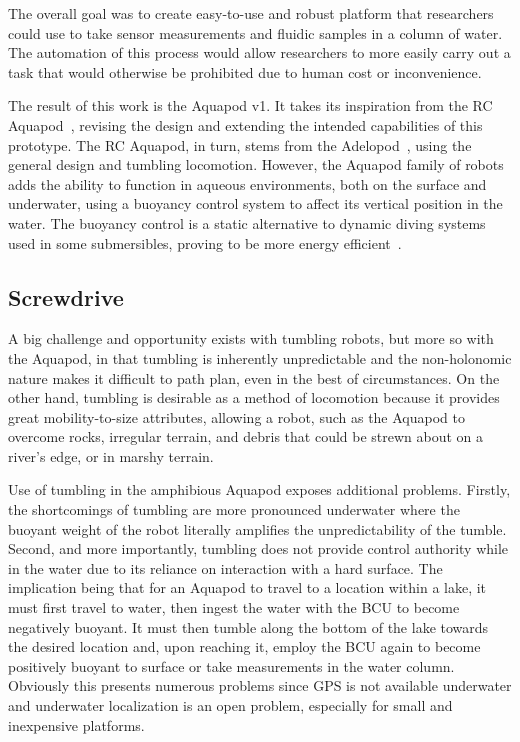 The overall goal was to create easy-to-use and robust platform that researchers could use to take sensor measurements and fluidic samples in a column of water. The automation of this process would allow researchers to more easily carry out a task that would otherwise be prohibited due to human cost or inconvenience. 

The result of this work is the Aquapod v1. It takes its inspiration from the RC Aquapod~\cite{Carlson2011}, revising the design and extending the intended capabilities of this prototype. The RC Aquapod, in turn, stems from the Adelopod~\cite{Hemes2011}, using the general design and tumbling locomotion. However, the Aquapod family of robots adds the ability to function in aqueous environments, both on the surface and underwater, using a buoyancy control system to affect its vertical position in the water.  The buoyancy control is a static alternative to dynamic diving systems used in some submersibles, proving to be more energy efficient~\cite{Detweiler2009}. 

\subsection{Screwdrive}
A big challenge and opportunity exists with tumbling robots, but more so with the Aquapod, in that tumbling is inherently unpredictable and the non-holonomic nature makes it difficult to path plan, even in the best of circumstances. On the other hand, tumbling is desirable as a method of locomotion because it provides great mobility-to-size attributes, allowing a robot, such as the Aquapod to overcome rocks, irregular terrain, and debris that could be strewn about on a river's edge, or in marshy terrain. 

Use of tumbling in the amphibious Aquapod exposes additional problems. Firstly, the shortcomings of tumbling are more pronounced underwater where the buoyant weight of the robot literally amplifies the unpredictability of the tumble. Second, and more importantly, tumbling does not provide control authority while in the water due to its reliance on interaction with a hard surface. The implication being that for an Aquapod to travel to a location within a lake, it must first travel to water, then ingest the water with the BCU to become negatively buoyant. It must then tumble along the bottom of the lake towards the desired location and, upon reaching it, employ the BCU again to become positively buoyant to surface or take measurements in the water column. Obviously this presents numerous problems since GPS is not available underwater and underwater localization is an open problem, especially for small and inexpensive platforms.

